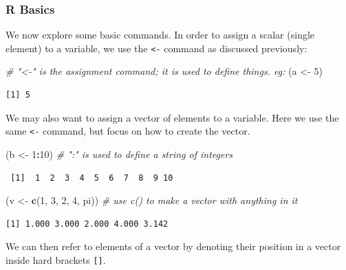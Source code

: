 \documentclass[12pt,]{book}
\newenvironment{Shaded}{\begin{snugshade}}{\end{snugshade}}
\newcommand{\CommentTok}[1]{\textcolor[rgb]{0.56,0.35,0.01}{\textit{#1}}}
\newcommand{\DecValTok}[1]{\textcolor[rgb]{0.00,0.00,0.81}{#1}}
\newcommand{\KeywordTok}[1]{\textcolor[rgb]{0.13,0.29,0.53}{\textbf{#1}}}
\newcommand{\NormalTok}[1]{#1}
\newcommand{\OperatorTok}[1]{\textcolor[rgb]{0.81,0.36,0.00}{\textbf{#1}}}
\newcommand{\StringTok}[1]{\textcolor[rgb]{0.31,0.60,0.02}{#1}}
\begin{document}
\hypertarget{r-basics}{%
\subsubsection{R Basics}\label{r-basics}}

We now explore some basic commands. In order to assign a scalar (single element) to a variable, we use the \texttt{\textless{}-} command as discussed previously:

\begin{Shaded}
\begin{Highlighting}[]
\CommentTok{# "<-"  is the assignment command; it is used to define things. eg:}
\NormalTok{(a <-}\StringTok{ }\DecValTok{5}\NormalTok{)     }
\end{Highlighting}
\end{Shaded}

\begin{verbatim}
[1] 5
\end{verbatim}

We may also want to assign a vector of elements to a variable. Here we use the same \texttt{\textless{}-} command, but focus on how to create the vector.

\begin{Shaded}
\begin{Highlighting}[]
\NormalTok{(b <-}\StringTok{ }\DecValTok{1}\OperatorTok{:}\DecValTok{10}\NormalTok{)              }\CommentTok{# ":"  is used to define a string of integers}
\end{Highlighting}
\end{Shaded}

\begin{verbatim}
 [1]  1  2  3  4  5  6  7  8  9 10
\end{verbatim}

\begin{Shaded}
\begin{Highlighting}[]
\NormalTok{(v <-}\StringTok{ }\KeywordTok{c}\NormalTok{(}\DecValTok{1}\NormalTok{, }\DecValTok{3}\NormalTok{, }\DecValTok{2}\NormalTok{, }\DecValTok{4}\NormalTok{, pi))   }\CommentTok{# use c() to make a vector with anything in it}
\end{Highlighting}
\end{Shaded}

\begin{verbatim}
[1] 1.000 3.000 2.000 4.000 3.142
\end{verbatim}

We can then refer to elements of a vector by denoting their position in a vector inside hard brackets \texttt{{[}{]}}.
\end{document}
